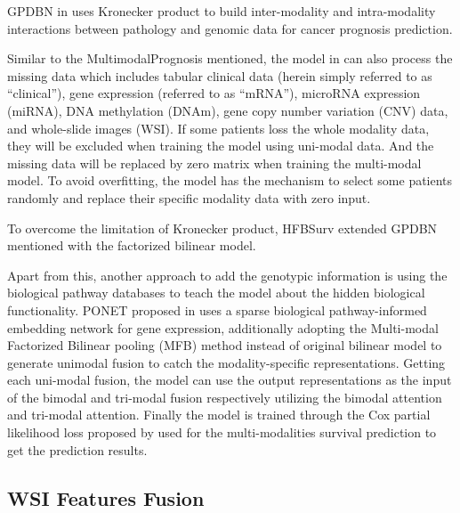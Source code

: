 \documentclass[journal,twoside,web]{ieeecolor}
\begin{document}
GPDBN in \cite{wang2021gpdbn} uses Kronecker product to build inter-modality and intra-modality interactions between pathology and genomic data for cancer prognosis prediction.

Similar to the MultimodalPrognosis mentioned, the model in \cite{vale2021long} can also process the missing data which includes tabular clinical data (herein simply referred to as “clinical”), gene expression (referred to as “mRNA”), microRNA expression (miRNA), DNA methylation (DNAm), gene copy number variation (CNV) data, and whole-slide images (WSI).
If some patients loss the whole modality data, they will be excluded when training the model using uni-modal data.
And the missing data will be replaced by zero matrix when training the multi-modal model.
To avoid overfitting, the model has the mechanism to select some patients randomly and replace their specific modality data with zero input.




To overcome the limitation of Kronecker product, HFBSurv extended GPDBN mentioned with the factorized bilinear model.





Apart from this, another approach to add the genotypic information is using the biological pathway databases to teach the model about the hidden biological functionality.
PONET proposed in \cite{qiu2023deep} uses a sparse biological pathway-informed embedding network for gene expression, additionally adopting the Multi-modal Factorized Bilinear pooling (MFB) method instead of original bilinear model to generate unimodal fusion to catch the modality-specific representations.
Getting each uni-modal fusion, the model can use the output representations as the input of the bimodal and tri-modal fusion respectively utilizing the bimodal attention and tri-modal attention.
Finally the model is trained through the Cox partial likelihood loss proposed by \cite{cheerla2019deep} used for the multi-modalities survival prediction to get the prediction results.





\subsection{WSI Features Fusion}
\end{document}

